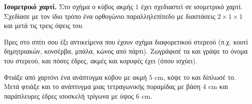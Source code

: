 \ex \textbf{Ισομετρικό χαρτί.} Στο σχήμα ο κύβος ακμής $1$ έχει σχεδιαστεί σε ισομετρικό χαρτί. Σχεδίασε με τον ίδιο τρόπο ένα ορθογώνιο παραλληλεπίπεδο με διαστάσεις $2\times1\times1$ και μετά τις τρεις όψεις του.
\begin{center}
\end{center}


\ex Βρες στο σπίτι σου έξι αντικείμενα που έχουν σχήμα διαφορετικού στερεού (π.χ. κουτί δημητριακών, κονσέρβα, μπάλα, κώνος από πάρτι). Ζωγράφισέ τα και γράψε το όνομα του στερεού, και πόσες έδρες, ακμές και κορυφές έχει (όπου ισχύει).

\ex Φτιάξε από χαρτόνι ένα ανάπτυγμα κύβου με ακμή $5$ cm, κόψε το και δίπλωσέ το. Μετά φτιάξε και το ανάπτυγμα μιας τετραγωνικής πυραμίδας με βάση $4$ cm και παράπλευρες έδρες ισοσκελή τρίγωνα με ύψος $6$ cm.
